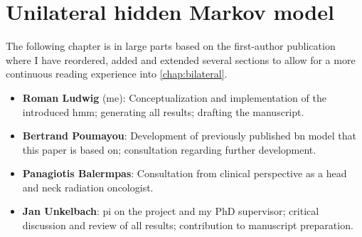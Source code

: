 \documentclass[\relativeRoot/main.tex]{subfiles}
\begin{document}
\chapter{Unilateral hidden Markov model}
\label{chap:unilateral}

\begin{tcolorbox}[title=\faIcon{users} Contributions, parbox=false]
    The following chapter is in large parts based on the first-author publication \textbf{} \cite{ludwig_hidden_2021} where I have reordered, added and extended several sections to allow for a more continuous reading experience into \cref{chap:bilateral}.

    \begin{itemize}[leftmargin=5.5mm]
        \item[\faIcon{user}] \textbf{Roman Ludwig} (me): Conceptualization and implementation of the introduced \gls{hmm}; generating all results; drafting the manuscript.
        \item[\faIcon{user}] \textbf{Bertrand Poumayou}: Development of previously published \gls{bn} model \cite{pouymayou_bayesian_2019} that this paper is based on; consultation regarding further development.
        \item[\faIcon{user}] \textbf{Panagiotis Balermpas}: Consultation from clinical perspective as a head and neck radiation oncologist.
        \item[\faIcon{user}] \textbf{Jan Unkelbach}: \Gls{pi} on the project and my PhD supervisor; critical discussion and review of all results; contribution to manuscript preparation.
    \end{itemize}
\end{tcolorbox}











\end{document}
